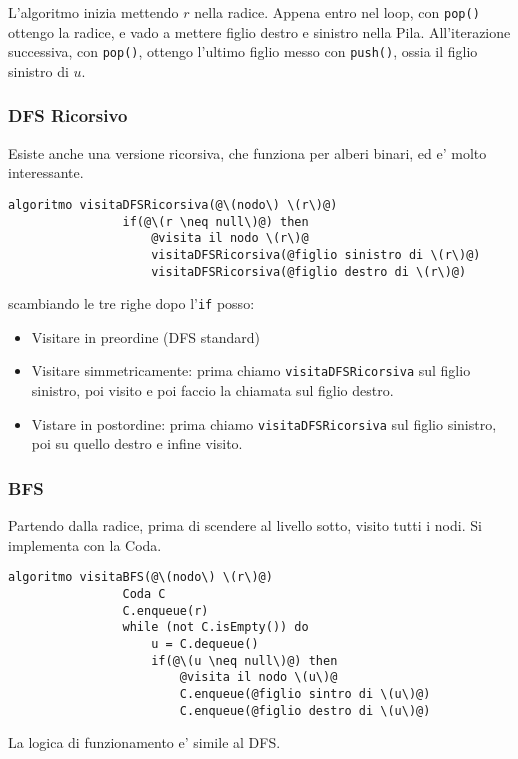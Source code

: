         L'algoritmo inizia mettendo \(r\) nella radice. Appena
        entro nel loop, con \texttt{pop()} ottengo la radice, e vado a mettere
        figlio destro e sinistro nella Pila.
        All'iterazione successiva, con \texttt{pop()}, ottengo l'ultimo figlio messo con \texttt{push()},
        ossia il figlio sinistro di \(u\). 
        
        \subsubsection{DFS Ricorsivo}
        Esiste anche una versione ricorsiva, che funziona per alberi binari, ed e' molto interessante.
        \begin{lstlisting}[escapechar=@]
            algoritmo visitaDFSRicorsiva(@\(nodo\) \(r\)@)
                if(@\(r \neq null\)@) then
                    @visita il nodo \(r\)@
                    visitaDFSRicorsiva(@figlio sinistro di \(r\)@)
                    visitaDFSRicorsiva(@figlio destro di \(r\)@)
        \end{lstlisting}

        scambiando le tre righe dopo l'\texttt{if} posso:
        \begin{itemize}
            \item Visitare in preordine (DFS standard)
            \item Visitare simmetricamente: prima chiamo \texttt{visitaDFSRicorsiva} sul figlio sinistro, poi visito e poi faccio la chiamata sul figlio destro.
            \item Vistare in postordine: prima chiamo \texttt{visitaDFSRicorsiva} sul figlio sinistro, poi su quello destro e infine visito.
        \end{itemize}
        
        \subsubsection{BFS}
        Partendo dalla radice, prima di scendere al livello sotto, visito tutti i nodi. Si implementa con 
        la Coda.

        \begin{lstlisting}[escapechar=@]
            algoritmo visitaBFS(@\(nodo\) \(r\)@)
                Coda C
                C.enqueue(r)
                while (not C.isEmpty()) do
                    u = C.dequeue()
                    if(@\(u \neq null\)@) then
                        @visita il nodo \(u\)@
                        C.enqueue(@figlio sintro di \(u\)@)
                        C.enqueue(@figlio destro di \(u\)@)
        \end{lstlisting}

        La logica di funzionamento e' simile al DFS.
